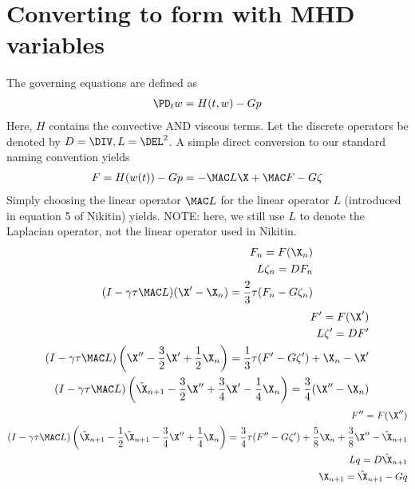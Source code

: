 \documentclass[11pt]{article}
\begin{document}
\newpage
\section{Converting to form with MHD variables}
The governing equations are defined as
\begin{equation}\begin{aligned}
  \PD_t w = H(t,w) - G p \\
\end{aligned}\end{equation}
Here, $H$ contains the convective AND viscous terms. Let the discrete operators be denoted by $D = \DIV, L = \DEL^2$. A simple direct conversion to our standard naming convention yields
\begin{equation}\begin{aligned}
  F = H(w(t)) - G p = - \MAC L \X + \MAC F - G \zeta \\
\end{aligned}\end{equation}
Simply choosing the linear operator $\MAC L$ for the linear operator $L$ (introduced in equation 5 of Nikitin) yields. NOTE: here, we still use $L$ to denote the Laplacian operator, not the linear operator used in Nikitin.
\begin{equation}\begin{aligned}
  F_n = F(\X_n) \\
  L \zeta_n = D F_n \\
  (I - \gamma \tau \MAC L) (\X' - \X_n) = \frac{2}{3} \tau (F_n - G \zeta_n) \\
\end{aligned}\end{equation}
\begin{equation}\begin{aligned}
  F' = F(\X') \\
  L \zeta' = D F' \\
  (I - \gamma \tau \MAC L) \left(\X'' - \frac{3}{2}\X' + \frac{1}{2} \X_n \right) = \frac{1}{3} \tau (F' - G \zeta') + \X_n - \X' \\
  (I - \gamma \tau \MAC L) \left(\tilde{\X}_{n+1} - \frac{3}{2}\X'' + \frac{3}{4} \X' - \frac{1}{4}\X_n\right) = \frac{3}{4} (\X'' - \X_n) \\
\end{aligned}\end{equation}
\begin{equation}\begin{aligned}
  F'' = F(\X'') \\
  (I - \gamma \tau \MAC L) \left(\hat{\X}_{n+1} - \frac{1}{2} \tilde{\X}_{n+1} - \frac{3}{4} \X'' + \frac{1}{4} \X_n\right) = \frac{3}{4} \tau (F'' - G \zeta') + \frac{5}{8} \X_n + \frac{3}{8} \X'' - \tilde{\X}_{n+1} \\
  L q = D \hat{\X}_{n+1} \\
  \X_{n+1} = \hat{\X}_{n+1} - G q \\
\end{aligned}\end{equation}
\end{document}
